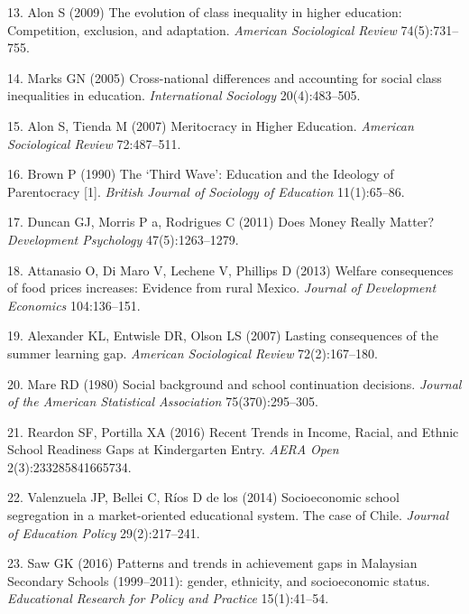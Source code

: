 \documentclass[9pt,twocolumn,twoside,]{pnas-new}
\begin{document}
\leavevmode\hypertarget{ref-Alon2009}{}%
13. Alon S (2009) The evolution of class inequality in higher education:
Competition, exclusion, and adaptation. \emph{American Sociological
Review} 74(5):731--755.

\leavevmode\hypertarget{ref-Marks2005}{}%
14. Marks GN (2005) Cross-national differences and accounting for social
class inequalities in education. \emph{International Sociology}
20(4):483--505.

\leavevmode\hypertarget{ref-Alon2007}{}%
15. Alon S, Tienda M (2007) Meritocracy in Higher Education.
\emph{American Sociological Review} 72:487--511.

\leavevmode\hypertarget{ref-Brown1990}{}%
16. Brown P (1990) The `Third Wave': Education and the Ideology of
Parentocracy {[}1{]}. \emph{British Journal of Sociology of Education}
11(1):65--86.

\leavevmode\hypertarget{ref-Duncan2011}{}%
17. Duncan GJ, Morris P a, Rodrigues C (2011) Does Money Really Matter?
\emph{Development Psychology} 47(5):1263--1279.

\leavevmode\hypertarget{ref-Attanasio2013}{}%
18. Attanasio O, Di Maro V, Lechene V, Phillips D (2013) Welfare
consequences of food prices increases: Evidence from rural Mexico.
\emph{Journal of Development Economics} 104:136--151.

\leavevmode\hypertarget{ref-Alexander2007}{}%
19. Alexander KL, Entwisle DR, Olson LS (2007) Lasting consequences of
the summer learning gap. \emph{American Sociological Review}
72(2):167--180.

\leavevmode\hypertarget{ref-Mare1980}{}%
20. Mare RD (1980) Social background and school continuation decisions.
\emph{Journal of the American Statistical Association} 75(370):295--305.

\leavevmode\hypertarget{ref-Reardon2016}{}%
21. Reardon SF, Portilla XA (2016) Recent Trends in Income, Racial, and
Ethnic School Readiness Gaps at Kindergarten Entry. \emph{AERA Open}
2(3):233285841665734.

\leavevmode\hypertarget{ref-Valenzuela2014}{}%
22. Valenzuela JP, Bellei C, Ríos D de los (2014) Socioeconomic school
segregation in a market-oriented educational system. The case of Chile.
\emph{Journal of Education Policy} 29(2):217--241.

\leavevmode\hypertarget{ref-Saw2016}{}%
23. Saw GK (2016) Patterns and trends in achievement gaps in Malaysian
Secondary Schools (1999--2011): gender, ethnicity, and socioeconomic
status. \emph{Educational Research for Policy and Practice}
15(1):41--54.
\end{document}
